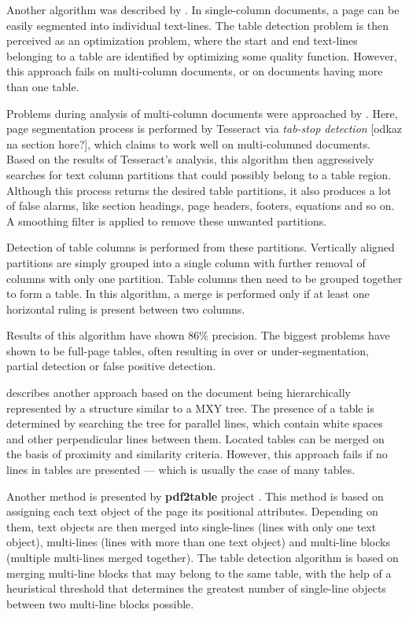 Another algorithm was described by \citet{MediumTable}. In single-column documents, a page can be easily segmented into individual text-lines. The table detection problem is then perceived as an optimization problem, where the start and end text-lines belonging to a table are identiﬁed by optimizing some quality function. However, this approach fails on multi-column documents, or on documents having more than one table.

Problems during analysis of multi-column documents were approached by \citet{tableDetHeterogeneous}. Here, page segmentation process is performed by Tesseract via \emph{tab-stop detection} [odkaz na section hore?], which claims to work well on multi-columned documents. Based on the results of Tesseract's analysis, this algorithm then aggressively searches for text column partitions that could possibly belong to a table region. Although this process returns the desired table partitions, it also produces a lot of false alarms, like section headings, page headers, footers, equations and so on. A smoothing filter is applied to remove these unwanted partitions.

Detection of table columns is performed from these partitions. Vertically aligned partitions are simply grouped into a single column with further removal of columns with only one partition. Table columns then need to be grouped together to form a table. In this algorithm, a merge is performed only if at least one horizontal ruling is present between two columns.

Results of this algorithm have shown 86\% precision. The biggest problems have shown to be full-page tables, often resulting in over or under-segmentation, partial detection or false positive detection. 

\citet{tableDetectCesarini} describes another approach based on the document being hierarchically represented by a structure similar to a MXY tree. The presence of a table is determined by searching the tree for parallel lines, which contain white spaces and other perpendicular lines between them. Located tables can be merged on the basis of proximity and similarity criteria. However, this approach fails if no lines in tables are presented --- which is usually the case of many tables.

Another method is presented by \textbf{pdf2table} project \cite{pdf2table}. This method is based on assigning each text object of the page its positional attributes. Depending on them, text objects are then merged into single-lines (lines with only one text object), multi-lines (lines with more than one text object) and multi-line blocks (multiple multi-lines merged together). The table detection algorithm is based on merging multi-line blocks that may belong to the same table, with the help of a heuristical threshold that determines the greatest number of single-line objects between two multi-line blocks possible.

